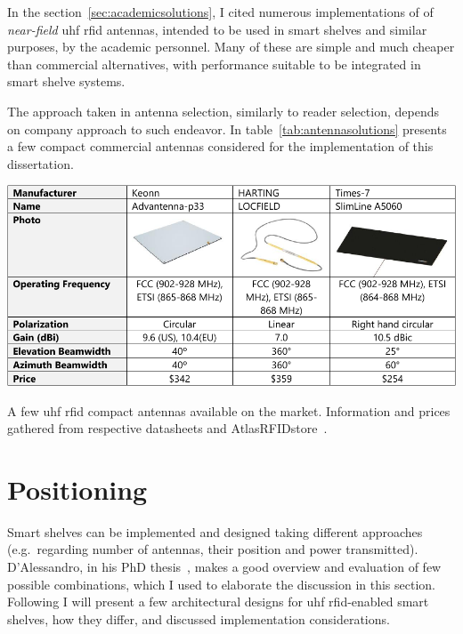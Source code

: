 In the section~\ref{sec:academicsolutions}, I cited numerous implementations of of \emph{near-field} \ac{uhf} \ac{rfid} antennas, intended to be used in smart shelves and similar purposes, by the academic personnel. Many of these are simple and much cheaper than commercial alternatives, with performance suitable to be integrated in smart shelve systems. 

The approach taken in antenna selection, similarly to reader selection, depends on company approach to such endeavor. 
In table~\ref{tab:antennasolutions} presents a few compact commercial antennas considered for the implementation of this dissertation.

\begin{table}
    \centering
    \includegraphics[width=\linewidth]{./figs/02-state-of-the-art/table_antennas.pdf}
    \caption[A few \ac{uhf} \ac{rfid} compact antennas available on the market]{A few \ac{uhf} \ac{rfid} compact antennas available on the market. Information and prices gathered from respective datasheets and AtlasRFIDstore~\cite{AtlasRFIDstoreBuyRFID}.}
    \label{tab:antennasolutions}
\end{table}

\section{Positioning}

Smart shelves can be implemented and designed taking different approaches (e.g.\ regarding number of antennas, their position and power transmitted).
D’Alessandro, in his PhD thesis~\cite{dalessandroRFIDBasedSmartShelving2012}, makes a good overview and evaluation of few possible combinations, which I used to elaborate the discussion in this section.
Following I will present a few architectural designs for \ac{uhf} \ac{rfid}-enabled smart shelves, how they differ, and discussed implementation considerations.

